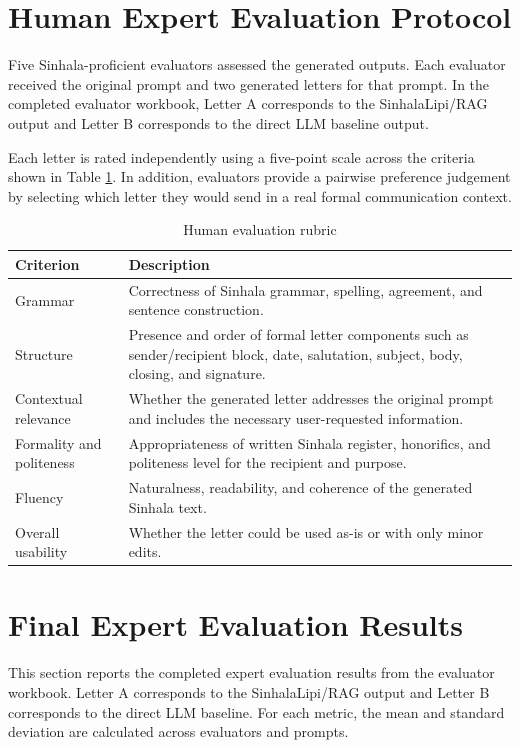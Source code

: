 \documentclass[12pt]{uomthesis}
\begin{document}
\section{Human Expert Evaluation Protocol}

Five Sinhala-proficient evaluators assessed the generated outputs. Each evaluator received the original prompt and two generated letters for that prompt. In the completed evaluator workbook, Letter A corresponds to the SinhalaLipi/RAG output and Letter B corresponds to the direct LLM baseline output.

Each letter is rated independently using a five-point scale across the criteria shown in Table \ref{tab:evaluation_rubric}. In addition, evaluators provide a pairwise preference judgement by selecting which letter they would send in a real formal communication context.

\begin{table}[!htbp]
\centering
\small
\begin{tabularx}{\linewidth}{@{}p{3.5cm}X@{}}
\toprule
\textbf{Criterion} & \textbf{Description} \\
\midrule
Grammar & Correctness of Sinhala grammar, spelling, agreement, and sentence construction. \\
Structure & Presence and order of formal letter components such as sender/recipient block, date, salutation, subject, body, closing, and signature. \\
Contextual relevance & Whether the generated letter addresses the original prompt and includes the necessary user-requested information. \\
Formality and politeness & Appropriateness of written Sinhala register, honorifics, and politeness level for the recipient and purpose. \\
Fluency & Naturalness, readability, and coherence of the generated Sinhala text. \\
Overall usability & Whether the letter could be used as-is or with only minor edits. \\
\bottomrule
\end{tabularx}
\caption{Human evaluation rubric}
\label{tab:evaluation_rubric}
\end{table}

\section{Final Expert Evaluation Results}

This section reports the completed expert evaluation results from the evaluator workbook. Letter A corresponds to the SinhalaLipi/RAG output and Letter B corresponds to the direct LLM baseline. For each metric, the mean and standard deviation are calculated across evaluators and prompts.
\end{document}
